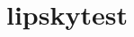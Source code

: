 \chapter{lipskytest }
\hypertarget{md__r_e_a_d_m_e}{}\label{md__r_e_a_d_m_e}
\label{md__r_e_a_d_m_e_autotoc_md0}%
%
